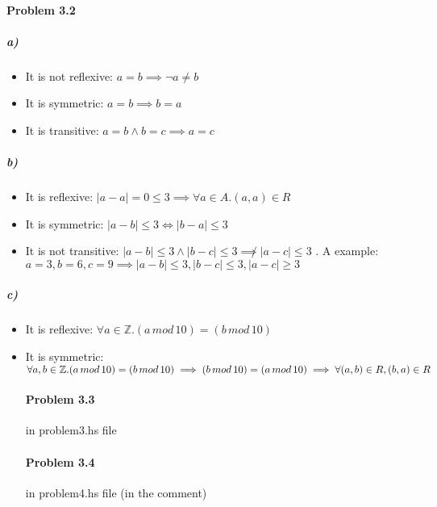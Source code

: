 \documentclass{article}
\begin{document}
\paragraph{Problem 3.2}
\subparagraph{a)} \begin{itemize}
\item It is not reflexive: $ a = b \implies \neg a \neq b $
\item It is symmetric: $ a = b \implies b = a $
\item It is transitive: $ a = b \land b = c \implies a = c $
\end{itemize}
\subparagraph{b)} \begin{itemize}
\item It is reflexive: $ \mid a - a \mid = 0 \leq 3 \implies \forall a \in A.(a, a) \in R$
\item It is symmetric: $ \mid a - b \mid \leq 3 \iff \mid b - a \mid \leq 3$
\item It is not transitive: $ \mid a - b \mid \leq 3 \land \mid b - c \mid \leq 3 \not \implies \mid a - c \mid \leq 3 $ .
A example:
$ a = 3, b = 6, c = 9 \implies \mid a - b \mid \leq 3 , \mid b - c \mid \leq 3 , \mid a - c \mid \geq 3 $
\end{itemize}
\subparagraph{c)} \begin{itemize}
\item It is reflexive: $ \forall a \in \mathbb{Z} .(a \, mod \, 10) = (b \, mod \, 10) $
\item It is symmetric: $ \forall a,b \in \mathbb{Z}.(a \, mod \, 10) = (b \, mod \, 10) \\ \implies (b \, mod \, 10) = (a \, mod \, 10) \implies \forall (a,b) \in R, (b,a) \in R$
    \paragraph{Problem 3.3} in problem3.hs file
    \paragraph{Problem 3.4} in problem4.hs file (in the comment)

\end{itemize}
\end{document}
